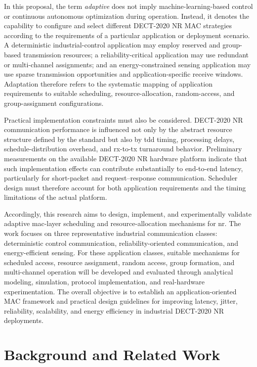 \documentclass[12pt,a4paper]{article}
\begin{document}
In this proposal, the term \textit{adaptive} does not imply machine-learning-based control or continuous autonomous optimization during operation. Instead, it denotes the capability to configure and select different DECT-2020 NR MAC strategies according to the requirements of a particular application or deployment scenario. A deterministic industrial-control application may employ reserved and group-based transmission resources; a reliability-critical application may use redundant or multi-channel assignments; and an energy-constrained sensing application may use sparse transmission opportunities and application-specific receive windows. Adaptation therefore refers to the systematic mapping of application requirements to suitable scheduling, resource-allocation, random-access, and group-assignment configurations.

Practical implementation constraints must also be considered. DECT-2020 NR communication performance is influenced not only by the abstract resource structure defined by the standard but also by \gls{tdd} timing, processing delays, schedule-distribution overhead, and \gls{rx}-to-\gls{tx} turnaround behavior. Preliminary measurements on the available DECT-2020 NR hardware platform indicate that such implementation effects can contribute substantially to end-to-end latency, particularly for short-packet and request--response communication. Scheduler design must therefore account for both application requirements and the timing limitations of the actual platform.

Accordingly, this research aims to design, implement, and experimentally validate adaptive \gls{mac}-layer scheduling and resource-allocation mechanisms for \gls{nr}. The work focuses on three representative industrial communication classes: deterministic control communication, reliability-oriented communication, and energy-efficient sensing. For these application classes, suitable mechanisms for scheduled access, resource assignment, random access, group formation, and multi-channel operation will be developed and evaluated through analytical modeling, simulation, protocol implementation, and real-hardware experimentation. The overall objective is to establish an application-oriented MAC framework and practical design guidelines for improving latency, jitter, reliability, scalability, and energy efficiency in industrial DECT-2020 NR deployments.



\section{Background and Related Work}
\end{document}

